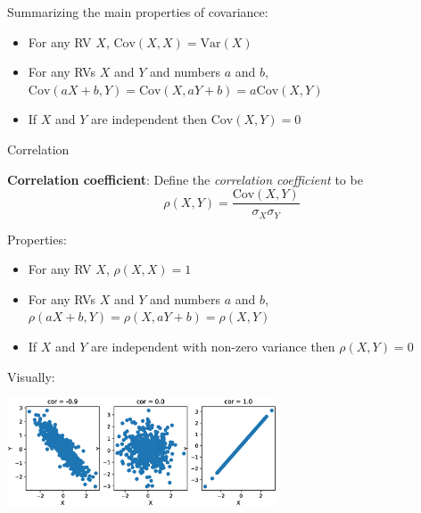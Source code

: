 {    \begin{frame}
        Summarizing the main properties of covariance:
        \begin{itemize}
            \item For any RV $X$, $\mathrm{Cov}(X, X) = \mathrm{Var}(X)$
            \item For any RVs $X$ and $Y$ and numbers $a$ and $b$,
                  $\mathrm{Cov}(aX+b, Y) = \mathrm{Cov}(X, aY+b) = a\mathrm{Cov}(X, Y)$
            \item If $X$ and $Y$ are independent then $\mathrm{Cov}(X, Y) = 0$
        \end{itemize}

    \end{frame}

    \begin{frame}{Correlation}
        \vspace*{-2mm}
        \begin{boxed}
            \textbf{Correlation coefficient}:
            Define the \emph{correlation coefficient} to be
            $$\rho(X, Y) = \frac{\mathrm{Cov}(X, Y)}{\sigma_{X}\sigma_{Y}}$$
        \end{boxed}

        \vspace*{-1mm}
        Properties:
        \vspace*{-1mm}
        \begin{itemize}
            \item For any RV $X$, $\rho(X, X) = 1$
            \item For any RVs $X$ and $Y$ and numbers $a$ and $b$, $\rho(aX+b, Y) = \rho(X, aY+b) = \rho(X, Y)$
            \item If $X$ and $Y$ are independent with non-zero variance then $\rho(X, Y) = 0$
        \end{itemize}

        Visually:
        \vspace*{-5mm}
        \begin{center}
            \includegraphics[width=0.6\textwidth]{fig/prob_corr.eps}
        \end{center}
    \end{frame}

}

